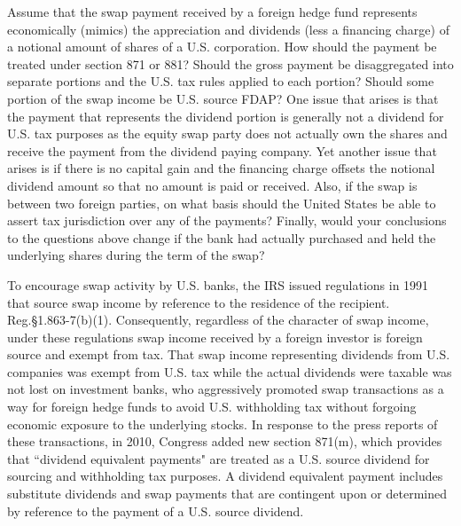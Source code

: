 Assume that the swap payment received by a foreign hedge fund represents economically (mimics) the appreciation and dividends (less a financing charge) of a notional amount of shares of a U.S. corporation.  How should the payment be treated under section 871 or 881?  Should the gross payment be disaggregated into separate portions and the U.S. tax rules applied to each portion?  Should some portion of the swap income be U.S. source FDAP?  One issue that arises is that the payment that represents the dividend portion is generally not a dividend for U.S. tax purposes as the equity swap party does not actually own the shares and receive the payment from the dividend paying company.  Yet another issue that arises is if there is no capital gain and the financing charge offsets the notional dividend amount so that no amount is paid or received.  Also, if the swap is between two foreign parties, on what basis should the United States be able to assert tax jurisdiction over any of the payments?  Finally, would your conclusions to the questions above change if the bank had actually purchased and held the underlying shares during the term of the swap?

To encourage swap activity by U.S. banks, the IRS issued regulations in 1991 that source swap income by reference to the residence of the recipient.  Reg.\@ \S1.863-7(b)(1).  Consequently, regardless of the character of swap income, under these regulations swap income received by a foreign investor is foreign source and exempt from tax.  That swap income representing dividends from U.S. companies was exempt from U.S. tax while the actual dividends were taxable was not lost on investment banks, who aggressively promoted swap transactions as a way for foreign hedge funds to avoid U.S. withholding tax without forgoing economic exposure to the underlying stocks.  In response to the press reports of these transactions, in 2010, Congress added new section 871(m), which provides that ``dividend equivalent payments" are treated as a U.S. source dividend for sourcing and withholding tax purposes.  A dividend equivalent payment includes substitute dividends and swap payments that are contingent upon or determined by reference to the payment of a U.S. source dividend.  



